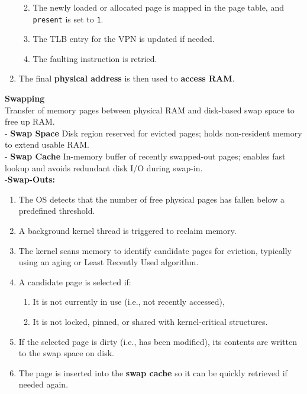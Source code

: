 \documentclass[8pt]{extarticle}
\begin{document}
\begin{minipage}[htp]{0.5\textwidth}
\begin{minipage}[htp]{1\textwidth}
\begin{enumerate}[noitemsep,nolistsep,topsep=-10px,partopsep=0pt,parsep=0pt]
\begin{enumerate}[noitemsep,nolistsep,topsep=0pt]
\begin{enumerate}[noitemsep,nolistsep,topsep=0pt]
\begin{enumerate}[noitemsep,nolistsep,topsep=0pt]
            \end{enumerate}
        \end{enumerate}
        \item The newly loaded or allocated page is mapped in the page table, and \texttt{present} is set to \texttt{1}.
        \item The TLB entry for the VPN is updated if needed.
        \item The faulting instruction is retried.
    \end{enumerate}
    \item The final \textbf{physical address} is then used to \textbf{access RAM}.
\end{enumerate}
\vspace{1em}
\noindent\textbf{Swapping}\\
Transfer of memory pages between physical RAM and disk-based swap space to free up RAM.\\
- \textbf{Swap Space} Disk region reserved for evicted pages; holds non-resident memory to extend usable RAM.\\ 
- \textbf{Swap Cache} In-memory buffer of recently swapped-out pages; enables fast lookup and avoids redundant disk I/O during swap-in. \\
-\noindent\textbf{Swap-Outs:}
\begin{enumerate}[noitemsep,nolistsep,topsep=-5px,partopsep=0pt,parsep=0pt]
    \item The OS detects that the number of free physical pages has fallen below a predefined threshold.
    \item A background kernel thread is triggered to reclaim memory.
    \item The kernel scans memory to identify candidate pages for eviction, typically using an aging or Least Recently Used algorithm.
    \item A candidate page is selected if:
    \begin{enumerate}[noitemsep,nolistsep,topsep=0pt]
        \item It is not currently in use (i.e., not recently accessed),
        \item It is not locked, pinned, or shared with kernel-critical structures.
    \end{enumerate}
    \item If the selected page is dirty (i.e., has been modified), its contents are written to the swap space on disk.
    \item The page is inserted into the \textbf{swap cache} so it can be quickly retrieved if needed again.

\end{enumerate}
\end{minipage}
\end{minipage}
\end{document}
